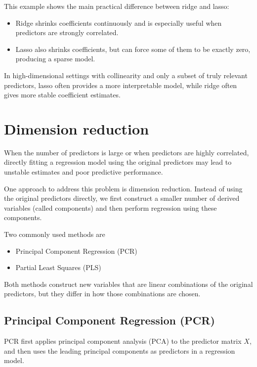 \documentclass[
  letterpaper,
  DIV=11,
  numbers=noendperiod]{scrreprt}
\providecommand{\tightlist}{%
  \setlength{\itemsep}{0pt}\setlength{\parskip}{0pt}}
\theoremstyle{definition}
\theoremstyle{definition}
\theoremstyle{plain}
\theoremstyle{plain}
\theoremstyle{remark}
\begin{document}
This example shows the main practical difference between ridge and
lasso:

\begin{itemize}
\tightlist
\item
  Ridge shrinks coefficients continuously and is especially useful when
  predictors are strongly correlated.
\item
  Lasso also shrinks coefficients, but can force some of them to be
  exactly zero, producing a sparse model.
\end{itemize}

In high-dimensional settings with collinearity and only a subset of
truly relevant predictors, lasso often provides a more interpretable
model, while ridge often gives more stable coefficient estimates.

\chapter{Dimension reduction}\label{dimension-reduction}

When the number of predictors is large or when predictors are highly
correlated, directly fitting a regression model using the original
predictors may lead to unstable estimates and poor predictive
performance.

One approach to address this problem is dimension reduction. Instead of
using the original predictors directly, we first construct a smaller
number of derived variables (called components) and then perform
regression using these components.

Two commonly used methods are

\begin{itemize}
\tightlist
\item
  Principal Component Regression (PCR)
\item
  Partial Least Squares (PLS)
\end{itemize}

Both methods construct new variables that are linear combinations of the
original predictors, but they differ in how those combinations are
chosen.

\section{Principal Component Regression
(PCR)}\label{principal-component-regression-pcr}

PCR first applies principal component analysis (PCA) to the predictor
matrix \(X\), and then uses the leading principal components as
predictors in a regression model.
\end{document}
